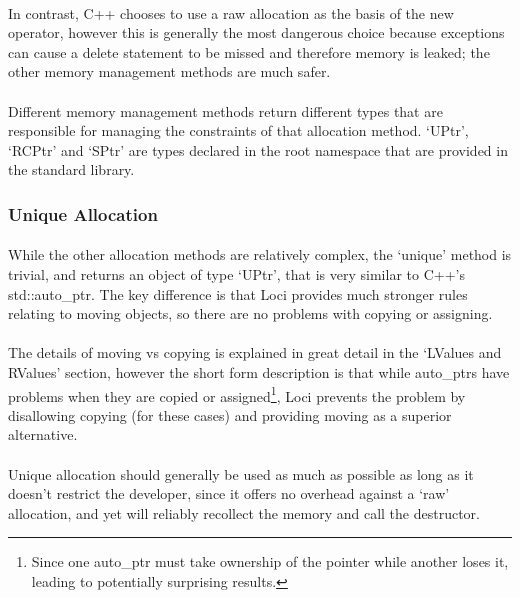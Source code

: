 \documentclass[12pt,twoside,notitlepage]{report}
\begin{document}
\paragraph{}
In contrast, C++ chooses to use a raw allocation as the basis of the new operator, however this is generally the most dangerous choice because exceptions can cause a delete statement to be missed and therefore memory is leaked; the other memory management methods are much safer.

\paragraph{}
Different memory management methods return different types that are responsible for managing the constraints of that allocation method. `UPtr', `RCPtr' and `SPtr' are types declared in the root namespace that are provided in the standard library.

\subsubsection{Unique Allocation}

\paragraph{}
While the other allocation methods are relatively complex, the `unique' method is trivial, and returns an object of type `UPtr', that is very similar to C++'s std::auto\_ptr. The key difference is that Loci provides much stronger rules relating to moving objects, so there are no problems with copying or assigning.

\paragraph{}
The details of moving vs copying is explained in great detail in the `LValues and RValues' section, however the short form description is that while auto\_ptrs have problems when they are copied or assigned\footnote{Since one auto\_ptr must take ownership of the pointer while another loses it, leading to potentially surprising results.}, Loci prevents the problem by disallowing copying (for these cases) and providing moving as a superior alternative.

\paragraph{}
Unique allocation should generally be used as much as possible as long as it doesn't restrict the developer, since it offers no overhead against a `raw' allocation, and yet will reliably recollect the memory and call the destructor.
\end{document}
